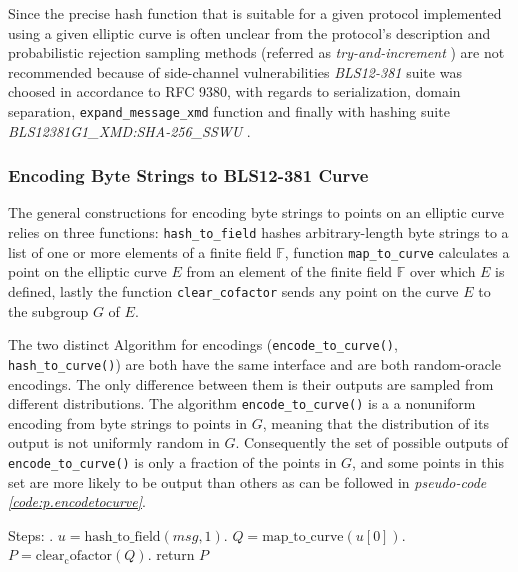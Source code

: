 Since the precise hash function that is suitable for a given protocol implemented using a given elliptic curve is often unclear from the protocol's description 
and probabilistic rejection sampling methods (referred as \textit{try-and-increment} )
are not recommended because of side-channel vulnerabilities \textit{BLS12-381} suite was choosed in accordance to RFC 9380, with regards to serialization, domain separation, \lstinline|expand_message_xmd| function and finally with hashing suite \textit{BLS12381G1\_XMD:SHA-256\_SSWU }. \cite{ecc.hashing}


\subsubsection{Encoding Byte Strings to BLS12-381 Curve}

The general constructions for encoding byte strings to points 
on an elliptic curve relies on three functions: \lstinline|hash_to_field| hashes arbitrary-length byte strings to a list of one or more elements of a finite field $\mathbb{F}$, function \lstinline|map_to_curve| calculates a point on the elliptic curve $E$ from an element of the finite field $\mathbb{F}$ over which $E$ is defined, lastly the function \lstinline|clear_cofactor| sends any point on the curve $E$ to the
subgroup $G$ of $E$. \cite{ecc.hashing}

The two distinct Algorithm for encodings (\lstinline|encode_to_curve()|, \lstinline|hash_to_curve()|) are both have the same interface and are both random-oracle encodings. The only difference between them is their outputs are sampled from different distributions.   The algorithm \lstinline|encode_to_curve()| is a  a nonuniform encoding from byte strings to points in $G$, meaning that the distribution of its output is not
uniformly random in $G$. Consequently the set of possible outputs of
\lstinline|encode_to_curve()| is only a fraction of the points in $G$, and some
points in this set are more likely to be output than others as can be followed in \textit{pseudo-code \ref{code:p.encodetocurve}}.\cite{ecc.hashing}

\begin{algorithm}[H]
	\SetAlgoLined
	Steps: . $u = \mathrm{hash\_to\_field}(msg, 1)$. $Q = \mathrm{map\_to\_curve}(u[0])$. $P = \mathrm{clear_cofactor}(Q)$. return $P$\;
	\caption{Pseudocode for encoding into elliptic curve\cite{ecc.hashing} under  Random-Oracle Model}\label{code:p.encodetocurve}
\end{algorithm}


